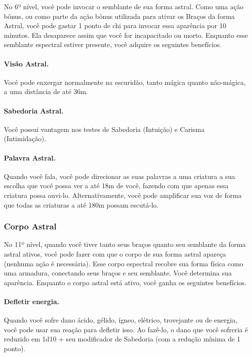 \begin{multicols}{2}
No 6º nível, você pode invocar o semblante de sua forma astral. Como uma ação
bônus, ou como parte da ação bônus utilizada para ativar os Braços da forma
Astral, você pode gastar 1 ponto de chi para invocar essa aparência por 10
minutos. Ela desaparece assim que você for incapacitado ou morto. Enquanto esse
semblante espectral estiver presente, você adquire os seguintes benefícios.

\paragraph{Visão Astral.}%
Você pode enxergar normalmente na escuridão, tanto mágica quanto não-mágica, a
uma distância de até 36m.

\paragraph{Sabedoria Astral.}%
Você possui vantagem nos testes de Sabedoria (Intuição) e Carisma (Intimidação).

\paragraph{Palavra Astral.}%
Quando você fala, você pode direcionar as suas palavras a uma criatura a sua
escolha que você possa ver a até 18m de você, fazendo com que apenas essa
criatura possa ouvi-lo. Alternativamente, você pode amplificar sua voz de forma
que todas as criaturas a até 180m possam escutá-lo.

\subsubsection*{Corpo Astral}%
\label{ssub:corpo_astral}

No 11º nível, quando você tiver tanto seus braços quanto seu semblante da forma
astral ativos, você pode fazer com que o corpo de sua forma astral apareça
(nenhuma ação é necessária). Esse corpo espectral recobre sua forma física como
uma armadura, conectando seus braços e seu semblante. Você determina sua
aparência. Enquanto o corpo astral está ativo, você ganha os seguintes
benefícios.

\paragraph{Defletir energia.}%
Quando você sofre dano ácido, gélido, ígneo, elétrico, trovejante ou de energia,
você pode usar sua reação para defletir isso. Ao fazê-lo, o dano que você
sofreria é reduzido em 1d10 + seu modificador de Sabedoria (com a redução mínima
de 1 ponto).


\end{multicols}
